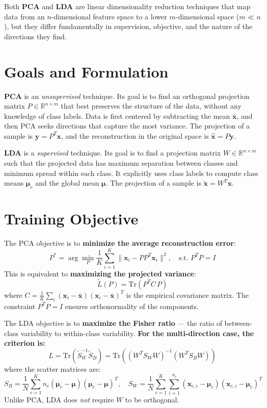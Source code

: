 Both \textbf{PCA} and \textbf{LDA} are linear dimensionality reduction techniques that map data from an $n$-dimensional feature space to a lower $m$-dimensional space ($m \ll n$), but they differ fundamentally in supervision, objective, and the nature of the directions they find.

\bigskip
\section*{Goals and Formulation}

\textbf{PCA} is an \emph{unsupervised} technique. Its goal is to find an orthogonal projection matrix $P \in \mathbb{R}^{n \times m}$ that best preserves the structure of the data, without any knowledge of class labels. Data is first centered by subtracting the mean $\bar{\mathbf{x}}$, and then PCA seeks directions that capture the most variance. The projection of a sample is $\mathbf{y} = P^T\mathbf{x}$, and the reconstruction in the original space is $\hat{\mathbf{x}} = P\mathbf{y}$.

\textbf{LDA} is a \emph{supervised} technique. Its goal is to find a projection matrix $W \in \mathbb{R}^{n \times m}$ such that the projected data has maximum separation between classes and minimum spread within each class. It explicitly uses class labels to compute class means $\boldsymbol{\mu}_c$ and the global mean $\boldsymbol{\mu}$. The projection of a sample is $\tilde{\mathbf{x}} = W^T\mathbf{x}$.

\bigskip
\section*{Training Objective}

The PCA objective is to \textbf{minimize the average reconstruction error}:
\[
P^* = \arg\min_P \frac{1}{K}\sum_{i=1}^K \|\mathbf{x}_i - PP^T\mathbf{x}_i\|^2, \quad \text{s.t. } P^TP = I
\]
This is equivalent to \textbf{maximizing the projected variance}:
\[
\widetilde{L}(P) = \text{Tr}\!\left(P^T C\, P\right)
\]
where $C = \frac{1}{K}\sum_i (\mathbf{x}_i - \bar{\mathbf{x}})(\mathbf{x}_i - \bar{\mathbf{x}})^T$ is the empirical covariance matrix. The constraint $P^TP = I$ ensures orthonormality of the components.

The LDA objective is to \textbf{maximize the Fisher ratio} --- the ratio of between-class variability to within-class variability. \textbf{For the multi-direction case, the criterion is:}
\[
L = \text{Tr}\!\left(\widetilde{S}_W^{-1}\widetilde{S}_B\right) = \text{Tr}\!\left((W^T S_W W)^{-1}(W^T S_B W)\right)
\]
where the scatter matrices are:
\[
S_B = \frac{1}{N}\sum_{c=1}^K n_c(\boldsymbol{\mu}_c - \boldsymbol{\mu})(\boldsymbol{\mu}_c - \boldsymbol{\mu})^T, \quad S_W = \frac{1}{N}\sum_{c=1}^K \sum_{i=1}^{n_c}(\mathbf{x}_{c,i} - \boldsymbol{\mu}_c)(\mathbf{x}_{c,i} - \boldsymbol{\mu}_c)^T
\]
Unlike PCA, LDA does \emph{not} require $W$ to be orthogonal.

